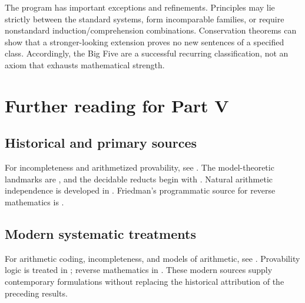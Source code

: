 The program has important exceptions and refinements. Principles may lie
strictly between the standard systems, form incomparable families, or require
nonstandard induction/comprehension combinations. Conservation theorems can
show that a stronger-looking extension proves no new sentences of a specified
class. Accordingly, the Big Five are a successful recurring classification,
not an axiom that exhausts mathematical strength.

\section{Further reading for Part V}
\label{sec:p05-further-reading}

\subsection*{Historical and primary sources}

For incompleteness and arithmetized provability, see
\cite{Godel1931,Rosser1936,Lob1955,Solovay1976,GuaspariSolovay1979}.
The model-theoretic landmarks are \cite{Skolem1934,Tennenbaum1959}, and the
decidable reducts begin with \cite{Presburger1929,Skolem1930Arithmetic,
FefermanVaught1959}.  Natural arithmetic independence is developed in
\cite{ParisHarrington1977,KanamoriMcAloon1987,Goodstein1944,KirbyParis1982}.
Friedman's programmatic source for reverse mathematics is
\cite{Friedman1975}.

\subsection*{Modern systematic treatments}

For arithmetic coding, incompleteness, and models of arithmetic, see
\cite{Shoenfield1967,BoolosBurgessJeffrey2007,Kaye1991}.  Provability logic is
treated in \cite{Boolos1993}; reverse mathematics in \cite{Simpson2009}.  These
modern sources supply contemporary formulations without replacing the
historical attribution of the preceding results.

